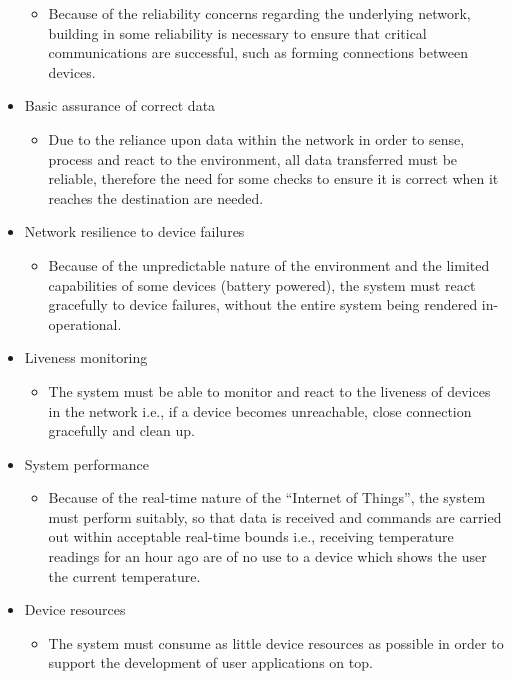 \begin{itemize}
	\begin{itemize}
		\item Because of the reliability concerns regarding the underlying network, building in some reliability is necessary to ensure that critical communications are successful, such as forming connections between devices. 
	\end{itemize}
	\item Basic assurance of correct data
	\begin{itemize}
			\item Due to the reliance upon data within the network in order to sense, process and react to the environment, all data transferred must be reliable, therefore the need for some checks to ensure it is correct when it reaches the destination are needed. 
	\end{itemize}
	\item Network resilience to device failures
	\begin{itemize}
		\item Because of the unpredictable nature of the environment and the limited capabilities of some devices (battery powered), the system must react gracefully to device failures, without the entire system being rendered in-operational.
	\end{itemize}
	\item Liveness monitoring
	\begin{itemize}
		\item The system must be able to monitor and react to the liveness of devices in the network i.e., if a device becomes unreachable, close connection gracefully and clean up.
	\end{itemize}
	\item System performance
	\begin{itemize}
		\item Because of the real-time nature of the ``Internet of Things'', the system must perform suitably, so that data is received and commands are carried out within acceptable real-time bounds i.e., receiving temperature readings for an hour ago are of no use to a device which shows the user the current temperature.
	\end{itemize}
	\item Device resources
	\begin{itemize}
		\item The system must consume as little device resources as possible in order to support the development of user applications on top.
	\end{itemize}
\end{itemize}

